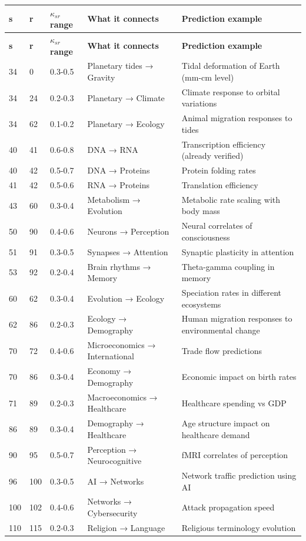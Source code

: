 \documentclass[13pt,a4paper]{article}
\begin{document}
	\begin{longtable}{|p{1cm}|p{1cm}|p{2.5cm}|p{4cm}|p{3cm}|}
		\hline
		\textbf{s} & \textbf{r} & \textbf{\(\kappa_{sr}\) range} & \textbf{What it connects} & \textbf{Prediction example} \\
		\hline
		\endfirsthead
		\hline
		\textbf{s} & \textbf{r} & \textbf{\(\kappa_{sr}\) range} & \textbf{What it connects} & \textbf{Prediction example} \\
		\hline
		\endhead
		
		34 & 0 & 0.3-0.5 & Planetary tides → Gravity & Tidal deformation of Earth (mm-cm level) \\
		34 & 24 & 0.2-0.3 & Planetary → Climate & Climate response to orbital variations \\
		34 & 62 & 0.1-0.2 & Planetary → Ecology & Animal migration responses to tides \\
		40 & 41 & 0.6-0.8 & DNA → RNA & Transcription efficiency (already verified) \\
		40 & 42 & 0.5-0.7 & DNA → Proteins & Protein folding rates \\
		41 & 42 & 0.5-0.6 & RNA → Proteins & Translation efficiency \\
		43 & 60 & 0.3-0.4 & Metabolism → Evolution & Metabolic rate scaling with body mass \\
		50 & 90 & 0.4-0.6 & Neurons → Perception & Neural correlates of consciousness \\
		51 & 91 & 0.3-0.5 & Synapses → Attention & Synaptic plasticity in attention \\
		53 & 92 & 0.2-0.4 & Brain rhythms → Memory & Theta-gamma coupling in memory \\
		60 & 62 & 0.3-0.4 & Evolution → Ecology & Speciation rates in different ecosystems \\
		62 & 86 & 0.2-0.3 & Ecology → Demography & Human migration responses to environmental change \\
		70 & 72 & 0.4-0.6 & Microeconomics → International & Trade flow predictions \\
		70 & 86 & 0.3-0.4 & Economy → Demography & Economic impact on birth rates \\
		71 & 89 & 0.2-0.3 & Macroeconomics → Healthcare & Healthcare spending vs GDP \\
		86 & 89 & 0.3-0.4 & Demography → Healthcare & Age structure impact on healthcare demand \\
		90 & 95 & 0.5-0.7 & Perception → Neurocognitive & fMRI correlates of perception \\
		96 & 100 & 0.3-0.5 & AI → Networks & Network traffic prediction using AI \\
		100 & 102 & 0.4-0.6 & Networks → Cybersecurity & Attack propagation speed \\
		110 & 115 & 0.2-0.3 & Religion → Language & Religious terminology evolution \\
		\hline
	\end{longtable}
	
\end{document}
